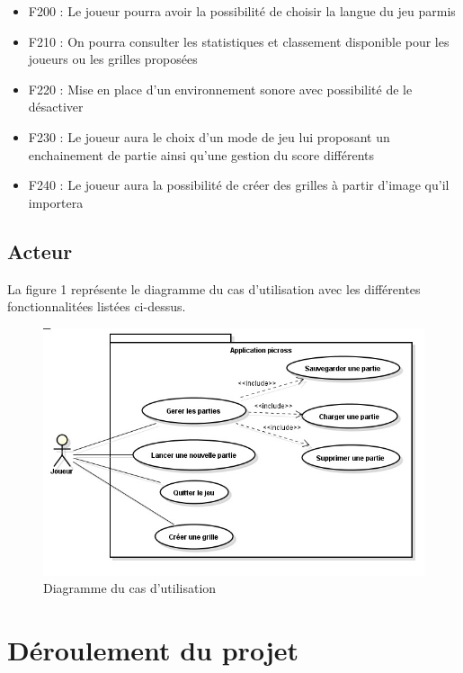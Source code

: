 \documentclass[11pt]{article}
\begin{document}
\begin{itemize}
	\item F200 : Le joueur pourra avoir la possibilité de choisir la langue du jeu parmis 
	\item F210 : On pourra consulter les statistiques et classement disponible pour les joueurs ou les grilles proposées
	\item F220 : Mise en place d'un environnement sonore avec possibilité de le désactiver
	\item F230 : Le joueur aura le choix d'un mode de jeu lui proposant un enchainement de partie ainsi qu'une gestion du score différents
	\item F240 : Le joueur aura la possibilité de créer des grilles à partir d'image qu'il importera
\end{itemize}

\newpage
\subsection{Acteur}
	    La figure 1 représente le diagramme du cas d'utilisation avec les différentes fonctionnalitées listées ci-dessus.
	\begin{figure}[!ht]
		\centering
		\includegraphics[]{UserCase.jpg}
		\caption{Diagramme du cas d'utilisation}
	\end{figure}

\newpage %

\section{Déroulement du projet}
\end{document}
